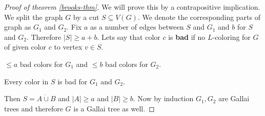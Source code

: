 \begin{proof}[Proof of theorem \ref{brooks-thm}]
	We will prove this by a contrapositive implication. We split the graph $G$ by a cut $S \subseteq V(G)$. We denote the corresponding parts of graph as $G_1$ and $G_2$. Fix $a$ as a number of edges between $S$ and $G_1$ and $b$ for $S$ and $G_2$. Therefore $|S| \geq a + b$. Lets say that color $c$ is \textbf{bad} if no $L$-coloring for $G$ of given color $c$ to vertex $v \in S$.
	
	\begin{observ}
		$\leq a$ bad colors for $G_1$ and $\leq b$ bad colors for $G_2$.
	\end{observ}
	
	\begin{observ}
		Every color in $S$ is bad for $G_1$ and $G_2$.
	\end{observ}
	
	Then $S = A \dot{\cup} B$ and $|A| \geq a$ and $|B| \geq b$. Now by induction $G_1, G_2$ are Gallai trees and therefore $G$ is a Gallai tree as well.
\end{proof}